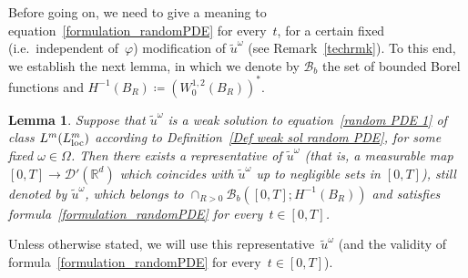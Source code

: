 \documentclass[a4paper,10pt]{article}
\newtheorem{lemma}[theorem]{Lemma}
\newcommand\1{\mathbbm{1}}
\newcommand{\mc}{\mathcal}
\newcommand{\td}{\tilde}
\newcommand\loc{{\rm loc}}
\numberwithin{equation}{section}
\begin{document}
Before going on, we need to give a meaning to equation~\eqref{formulation_randomPDE} for every~$t$, for a certain fixed (i.e.~independent of~$\varphi$) modification of $\td{u}^\omega$ (see Remark~\ref{techrmk}). To this end, we establish the next lemma, in which we denote by $\mc{B}_b$ the set of bounded Borel functions and $H^{-1}(B_R)\coloneqq (W^{1,2}_0(B_R))^*$.

\begin{lemma}\label{technicality}
Suppose that $\td{u}^\omega$ is a weak solution to equation~\eqref{random PDE 1} of class $L^{m}(L^{m}_\loc)$ according to Definition~\ref{Def weak sol random PDE}, for some fixed $\omega \in \Omega$. Then there exists a representative of $\td{u}^\omega$ \textup{(}that is, a measurable map $[0,T]\rightarrow\mc{D}'(\mathbb{R}^d)$ which coincides with $\td{u}^\omega$ up to negligible sets in $[0,T]$\textup{)}, still denoted by $\td{u}^\omega$, which belongs to $\cap_{R>0}\mc{B}_b([0,T];H^{-1}(B_R))$ and satisfies formula~\eqref{formulation_randomPDE} for every~$t \in [0,T]$.
\end{lemma}

Unless otherwise stated, we will use this representative~$\td{u}^\omega$ (and the validity of formula~\eqref{formulation_randomPDE} for every~$t \in [0,T]$).
\end{document}
